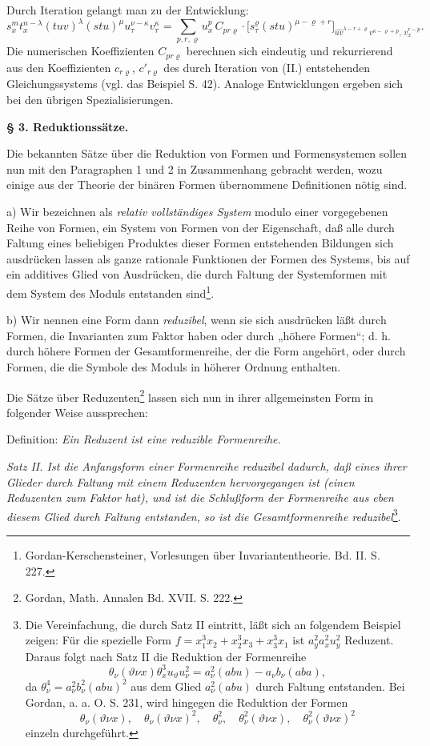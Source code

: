 \documentclass[11pt]{article}
\begin{document}
Durch Iteration gelangt man zu der Entwicklung:
\[
\tag{III}
s_x^m t_x^{n-\lambda}(tuv)^\lambda(stu)^\mu u_\tau^{\nu-\kappa}v_\tau^\kappa
=
\sum_{p,r,\varrho}u_x^p\,C_{pr\varrho}\cdot
\bigl[s_\tau^\varrho(stu)^{\mu-\varrho+r}\bigr]_{\widehat{uv}^{\lambda-r+\varrho}v^{\kappa-\varrho+p},\,v_x^{r-p}}.
\]
Die numerischen Koeffizienten $C_{pr\varrho}$ berechnen sich eindeutig und rekurrierend aus den Koeffizienten $c_{r\varrho}$, $c'_{r\varrho}$ des durch Iteration von (II.) entstehenden Gleichungssystems (vgl. das Beispiel S. 42). Analoge Entwicklungen ergeben sich bei den übrigen Spezialisierungen.

\begin{center}
\textbf{§ 3. \quad Reduktionssätze.}
\end{center}

Die bekannten Sätze über die Reduktion von Formen und Formensystemen sollen nun mit den Paragraphen 1 und 2 in Zusammenhang gebracht werden, wozu einige aus der Theorie der binären Formen übernommene Definitionen nötig sind.

a) Wir bezeichnen als \emph{relativ vollständiges System} modulo einer vorgegebenen Reihe von Formen, ein System von Formen von der Eigenschaft, daß alle durch Faltung eines beliebigen Produktes dieser Formen entstehenden Bildungen sich ausdrücken lassen als ganze rationale Funktionen der Formen des Systems, bis auf ein additives Glied von Ausdrücken, die durch Faltung der Systemformen mit dem System des Moduls entstanden sind\footnote{Gordan-Kerschensteiner, Vorlesungen über Invariantentheorie. Bd. II. S. 227.}.

b) Wir nennen eine Form dann \emph{reduzibel}, wenn sie sich ausdrücken läßt durch Formen, die Invarianten zum Faktor haben oder durch „höhere Formen“; d. h. durch höhere Formen der Gesamtformenreihe, der die Form angehört, oder durch Formen, die die Symbole des Moduls in höherer Ordnung enthalten.

Die Sätze über Reduzenten\footnote{Gordan, Math. Annalen Bd. XVII. S. 222.} lassen sich nun in ihrer allgemeinsten Form in folgender Weise aussprechen:

Definition: \emph{Ein Reduzent ist eine reduzible Formenreihe.}

\emph{Satz II. Ist die Anfangsform einer Formenreihe reduzibel dadurch, daß eines ihrer Glieder durch Faltung mit einem Reduzenten hervorgegangen ist (einen Reduzenten zum Faktor hat), und ist die Schlußform der Formenreihe aus eben diesem Glied durch Faltung entstanden, so ist die Gesamtformenreihe reduzibel}\footnote{Die Vereinfachung, die durch Satz II eintritt, läßt sich an folgendem Beispiel zeigen: Für die spezielle Form $f=x_1^3x_2+x_2^3x_3+x_3^3x_1$ ist $a_y^2a_x^2u_y^2$ Reduzent. Daraus folgt nach Satz II die Reduktion der Formenreihe
\[
\theta_\nu(\vartheta\nu x)\theta_x^3u_\vartheta u_\nu^2
=
a_\nu^2(abu)-a_\nu b_\nu(aba),
\]
da $\theta_\nu^4=a_\nu^2b_\nu^2(abu)^2$ aus dem Glied $a_\nu^2(abu)$ durch Faltung entstanden. Bei Gordan, a. a. O. S. 231, wird hingegen die Reduktion der Formen
\[
\theta_\nu(\vartheta\nu x),\quad \theta_\nu(\vartheta\nu x)^2,\quad
\theta_\nu^2,\quad \theta_\nu^2(\vartheta\nu x),\quad
\theta_\nu^2(\vartheta\nu x)^2
\]
einzeln durchgeführt.}.
\end{document}
